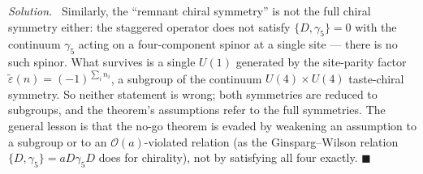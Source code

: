 \documentclass[11pt]{article}
\newenvironment{solution}{\par\smallskip\noindent\textit{Solution.}\ }{\hfill$\blacksquare$\par\smallskip}
\begin{document}
\begin{solution}
Similarly, the ``remnant chiral symmetry'' is not the full chiral symmetry either: the staggered operator does not satisfy $\{D,\gamma_5\}=0$ with the continuum $\gamma_5$ acting on a four-component spinor at a single site --- there is no such spinor. What survives is a single $U(1)$ generated by the site-parity factor $\tilde\varepsilon(n) = (-1)^{\sum_i n_i}$, a subgroup of the continuum $U(4)\times U(4)$ taste-chiral symmetry. So neither statement is wrong; both symmetries are reduced to subgroups, and the theorem's assumptions refer to the full symmetries. The general lesson is that the no-go theorem is evaded by weakening an assumption to a subgroup or to an $\mathcal{O}(a)$-violated relation (as the Ginsparg--Wilson relation $\{D,\gamma_5\} = aD\gamma_5 D$ does for chirality), not by satisfying all four exactly.
\end{solution}
\end{document}
